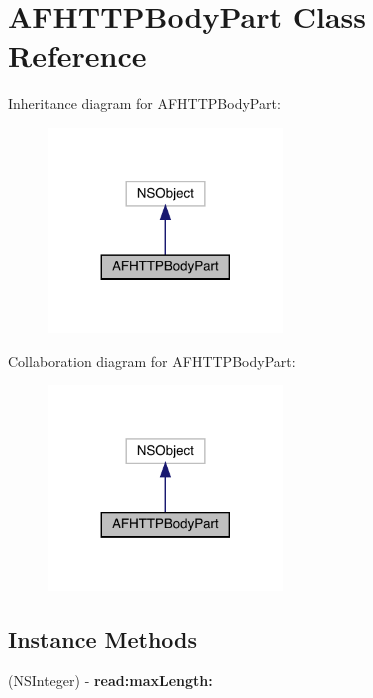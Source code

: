 \hypertarget{interface_a_f_h_t_t_p_body_part}{}\section{A\+F\+H\+T\+T\+P\+Body\+Part Class Reference}
\label{interface_a_f_h_t_t_p_body_part}


Inheritance diagram for A\+F\+H\+T\+T\+P\+Body\+Part\+:\nopagebreak
\begin{figure}[H]
\begin{center}
\leavevmode
\includegraphics[width=176pt]{interface_a_f_h_t_t_p_body_part__inherit__graph}
\end{center}
\end{figure}


Collaboration diagram for A\+F\+H\+T\+T\+P\+Body\+Part\+:\nopagebreak
\begin{figure}[H]
\begin{center}
\leavevmode
\includegraphics[width=176pt]{interface_a_f_h_t_t_p_body_part__coll__graph}
\end{center}
\end{figure}
\subsection*{Instance Methods}
\begin{DoxyCompactItemize}
\item 
\mbox{\label{interface_a_f_h_t_t_p_body_part_a5e8ec7896747371cf0310a61c6ea2229}} 
(N\+S\+Integer) -\/ {\bfseries read\+:max\+Length\+:}
\end{DoxyCompactItemize}
